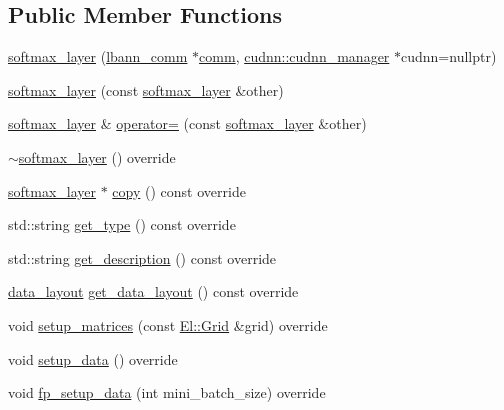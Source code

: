\subsection*{Public Member Functions}
\begin{DoxyCompactItemize}
\item 
\hyperlink{classlbann_1_1softmax__layer_aeac8e8c98c838929afc9ab6c82af24d2}{softmax\+\_\+layer} (\hyperlink{classlbann_1_1lbann__comm}{lbann\+\_\+comm} $\ast$\hyperlink{file__io_8cpp_ab048c6f9fcbcfaa57ce68b00263dbebe}{comm}, \hyperlink{classlbann_1_1cudnn_1_1cudnn__manager}{cudnn\+::cudnn\+\_\+manager} $\ast$cudnn=nullptr)
\item 
\hyperlink{classlbann_1_1softmax__layer_ad17b123fdc1c1d5fc57a1abe601de2b6}{softmax\+\_\+layer} (const \hyperlink{classlbann_1_1softmax__layer}{softmax\+\_\+layer} \&other)
\item 
\hyperlink{classlbann_1_1softmax__layer}{softmax\+\_\+layer} \& \hyperlink{classlbann_1_1softmax__layer_a8532a4e2b1669840cea80cfde383bebb}{operator=} (const \hyperlink{classlbann_1_1softmax__layer}{softmax\+\_\+layer} \&other)
\item 
\hyperlink{classlbann_1_1softmax__layer_aabd598a9b0cec63e2d4558fd79ecee0d}{$\sim$softmax\+\_\+layer} () override
\item 
\hyperlink{classlbann_1_1softmax__layer}{softmax\+\_\+layer} $\ast$ \hyperlink{classlbann_1_1softmax__layer_adbde9ddc7c6cec83645d4bebf8b54113}{copy} () const override
\item 
std\+::string \hyperlink{classlbann_1_1softmax__layer_a344145869f2f28f91d9de1fec74075e5}{get\+\_\+type} () const override
\item 
std\+::string \hyperlink{classlbann_1_1softmax__layer_afc8ecde99bde8cbacae5dc1779052d1d}{get\+\_\+description} () const override
\item 
\hyperlink{base_8hpp_a786677cbfb3f5677b4d84f3056eb08db}{data\+\_\+layout} \hyperlink{classlbann_1_1softmax__layer_af45bc0942bf38d6de7c28032d9bb0e73}{get\+\_\+data\+\_\+layout} () const override
\item 
void \hyperlink{classlbann_1_1softmax__layer_af07463a1d99832d3bf11610311fd7da4}{setup\+\_\+matrices} (const \hyperlink{base_8hpp_a9951bb1719d534e0401b1f06cad19eab}{El\+::\+Grid} \&grid) override
\item 
void \hyperlink{classlbann_1_1softmax__layer_a4cc8f1f44a2854e78dad4f898d66a5ac}{setup\+\_\+data} () override
\item 
void \hyperlink{classlbann_1_1softmax__layer_a313aa2f82acfbca8f3852378d00c22c3}{fp\+\_\+setup\+\_\+data} (int mini\+\_\+batch\+\_\+size) override

\end{DoxyCompactItemize}
